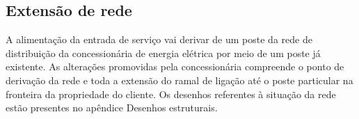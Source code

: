 \subsection{Extensão de rede}

A alimentação da entrada de serviço vai derivar de um poste da rede de distribuição da concessionária de energia elétrica por meio de um poste já existente. As alterações promovidas pela concessionária compreende o ponto de derivação da rede e toda a extensão do ramal de ligação até o poste particular na fronteira da propriedade do cliente. Os desenhos referentes à situação da rede estão presentes no apêndice Desenhos estruturais.